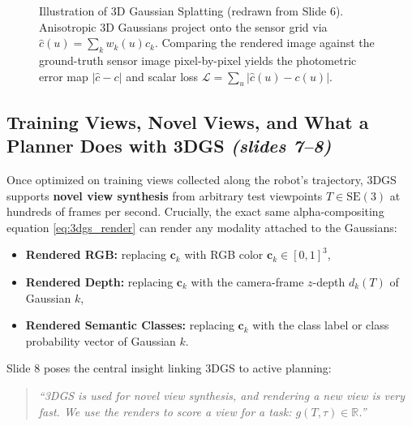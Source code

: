 \documentclass[11pt, a4paper]{article}
\theoremstyle{definition}
\begin{document}
\begin{figure}[htbp]
\caption{Illustration of 3D Gaussian Splatting (redrawn from Slide 6). Anisotropic 3D Gaussians project onto the sensor grid via $\hat{c}(u) = \sum_k w_k(u)c_k$. Comparing the rendered image against the ground-truth sensor image pixel-by-pixel yields the photometric error map $|\hat{c}-c|$ and scalar loss $\mathcal{L} = \sum_u |\hat{c}(u) - c(u)|$.}
\label{fig:3dgs_work}
\end{figure}

\subsection{Training Views, Novel Views, and What a Planner Does with 3DGS \emph{(slides 7--8)}}

Once optimized on training views collected along the robot's trajectory, 3DGS supports \textbf{novel view synthesis} from arbitrary test viewpoints $T \in \mathrm{SE}(3)$ at hundreds of frames per second. Crucially, the exact same alpha-compositing equation \eqref{eq:3dgs_render} can render any modality attached to the Gaussians:
\begin{itemize}[leftmargin=*]
    \item \textbf{Rendered RGB:} replacing $\mathbf{c}_k$ with RGB color $\mathbf{c}_k \in [0,1]^3$,
    \item \textbf{Rendered Depth:} replacing $\mathbf{c}_k$ with the camera-frame $z$-depth $d_k(T)$ of Gaussian $k$,
    \item \textbf{Rendered Semantic Classes:} replacing $\mathbf{c}_k$ with the class label or class probability vector of Gaussian $k$.
\end{itemize}

Slide 8 poses the central insight linking 3DGS to active planning:
\begin{quote}
\emph{``3DGS is used for novel view synthesis, and rendering a new view is very fast. We use the renders to score a view for a task: $g(T, \tau) \in \mathbb{R}$.''}
\end{quote}
\end{document}
